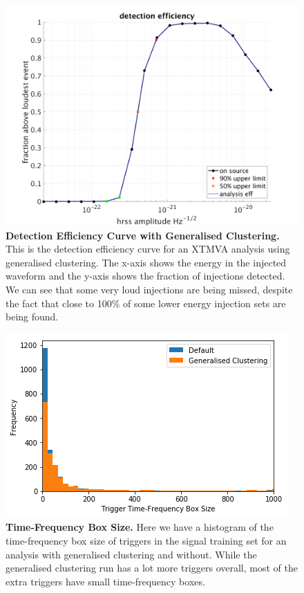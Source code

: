 \documentclass[11pt]{cuthesis}
\begin{document}
\begin{figure} %
\begin{center}
\includegraphics[width=0.8\linewidth]{gc_eff_nsbh.png}
\end{center}
\caption{\textbf{Detection Efficiency Curve with Generalised Clustering.} This is the detection efficiency curve for an XTMVA analysis using generalised clustering. The x-axis shows the energy in the injected waveform and the y-axis shows the fraction of injections detected. We can see that some very loud injections are being missed, despite the fact that close to 100\% of some lower energy injection sets are being found. }
\label{fig:gc eff}
\end{figure}

\begin{figure} %
\begin{center}
\includegraphics[width=0.8\linewidth]{tf_box_histogram.png}
\end{center}
\caption{\textbf{Time-Frequency Box Size.} Here we have a histogram of the time-frequency box size of triggers in the signal training set for an analysis with generalised clustering and without. While the generalised clustering run has a lot more triggers overall, most of the extra triggers have small time-frequency boxes. }
\label{fig:tf box hist}
\end{figure}
\end{document}
